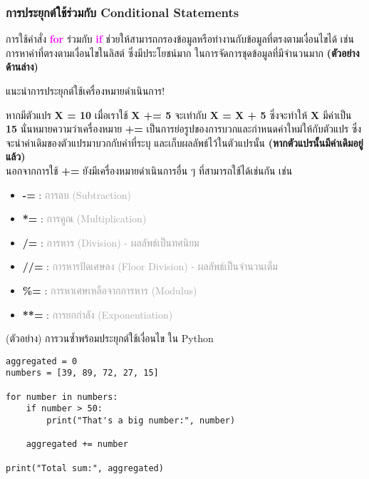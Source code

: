 \documentclass[12pt,a4paper]{article}
\newcommand{\textlight}[1]{{\thailightfont #1}}
\begin{document}
\subsubsection{การประยุกต์ใช้ร่วมกับ Conditional Statements}

\textlight{การใช้คำสั่ง \textbf{\textcolor{magenta}{for}} ร่วมกับ \textbf{\textcolor{magenta}{if}} ช่วยให้สามารถกรองข้อมูลหรือทำงานกับข้อมูลที่ตรงตามเงื่อนไขได้ เช่น การหาค่าที่ตรงตามเงื่อนไขในลิสต์ ซึ่งมีประโยชน์มาก ในการจัดการชุดข้อมูลที่มีจำนวนมาก \textbf{(ตัวอย่างด้านล่าง)}}

\begin{noticebox}{แนะนำการประยุกต์ใช้เครื่องหมายดำเนินการ!}

\textlight{หากมีตัวแปร \textbf{X = 10} เมื่อเราใช้ \textbf{X += 5} จะเท่ากับ \textbf{X = X + 5} ซึ่งจะทำให้ \textbf{X} มีค่าเป็น \textbf{15} นั่นหมายความว่าเครื่องหมาย \textbf{+=} เป็นการย่อรูปของการบวกและกำหนดค่าใหม่ให้กับตัวแปร ซึ่งจะนำค่าเดิมของตัวแปรมาบวกกับค่าที่ระบุ และเก็บผลลัพธ์ไว้ในตัวแปรนั้น \textbf{(หากตัวแปรนั้นมีค่าเดิมอยู่แล้ว)}}\\[0.5cm]
\textlight{นอกจากการใช้ \textbf{+=} ยังมีเครื่องหมายดำเนินการอื่น ๆ ที่สามารถใช้ได้เช่นกัน เช่น}

\begin{itemize}
    \item \textbf{-=} : \textcolor{darkgray}{การลบ (Subtraction)}
    \item \textbf{*=} : \textcolor{darkgray}{การคูณ (Multiplication)}
    \item \textbf{/=} : \textcolor{darkgray}{การหาร (Division) - ผลลัพธ์เป็นทศนิยม}
    \item \textbf{//=} : \textcolor{darkgray}{การหารปัดเศษลง (Floor Division) - ผลลัพธ์เป็นจำนวนเต็ม}
    \item \textbf{\%=} : \textcolor{darkgray}{การหาเศษเหลือจากการหาร (Modulus)}
    \item \textbf{**=} : \textcolor{darkgray}{การยกกำลัง (Exponentiation)}
\end{itemize}

\end{noticebox}

\begin{codebox}{(ตัวอย่าง) การวนซ้ำพร้อมประยุกต์ใช้เงื่อนไข ใน Python}
\begin{lstlisting}[style=python]
aggregated = 0
numbers = [39, 89, 72, 27, 15]

for number in numbers:
    if number > 50:
        print("That's a big number:", number)

    aggregated += number

print("Total sum:", aggregated)
\end{lstlisting}
\end{codebox}
\end{document}
